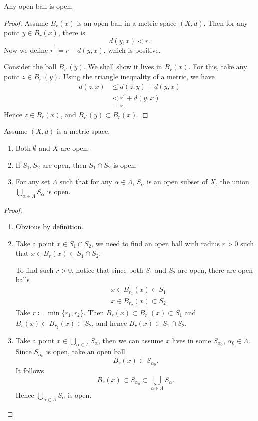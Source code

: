 \begin{proposition}
Any open ball is open.
\end{proposition}

\begin{proof}
Assume $B_r(x)$ is an open ball in a metric space $(X,d)$. Then for any point $y\in B_r(x)$, there is
\[ d(y,x)<r. \]
Now we define $r^\prime\coloneqq r-d(y,x)$, which is positive.

Consider the ball $B_{r^\prime}(y)$. We shall show it lives in $B_r(x)$. For this, take any point $z\in B_{r^\prime}(y)$. Using the triangle inequality of a metric, we have
\begin{align*}
d(z,x)&\le d(z,y)+d(y,x)\\
&<r^\prime+d(y,x)\\
&=r.
\end{align*}
Hence $z\in B_r(x)$, and $B_{r^\prime}(y)\subset B_r(x)$.
\end{proof}

\begin{proposition}
Assume $(X,d)$ is a metric space.
\begin{enumerate}[label=(\arabic*)]
\item Both $\emptyset$ and $X$ are open.
\item If $S_1,S_2$ are open, then $S_1\cap S_2$ is open.
\item For any set $\Lambda$ such that for any $\alpha\in\Lambda$, $S_\alpha$ is an open subset of $X$, the union $\bigcup_{\alpha\in\Lambda}S_\alpha$ is open.
\end{enumerate}
\end{proposition}

\begin{proof} \
\begin{enumerate}[label=(\arabic*)]
\item Obvious by definition.
\item Take a point $x\in S_1\cap S_2$, we need to find an open ball with radius $r>0$ such that $x\in B_r(x)\subset S_1\cap S_2$.

To find such $r>0$, notice that since both $S_1$ and $S_2$ are open, there are open balls
\begin{align*}
&x\in B_{r_1}(x)\subset S_1\\
&x\in B_{r_2}(x)\subset S_2
\end{align*}
Take $r\coloneqq\min\{r_1,r_2\}$. Then $B_r(x)\subset B_{r_1}(x)\subset S_1$ and $B_r(x)\subset B_{r_2}(x)\subset S_2$, and hence $B_r(x)\subset S_1\cap S_2$.

\item Take a point $x\in\bigcup_{\alpha\in\Lambda}S_\alpha$, then we can assume $x$ lives in some $S_{\alpha_0}$, $\alpha_0\in\Lambda$. Since $S_{\alpha_0}$ is open, take an open ball 
\[ B_r(x)\subset S_{\alpha_0}. \]
It follows
\[ B_r(x)\subset S_{\alpha_0}\subset\bigcup_{\alpha\in\Lambda}S_\alpha. \]
Hence $\bigcup_{\alpha\in\Lambda}S_\alpha$ is open.
\end{enumerate}
\end{proof}

